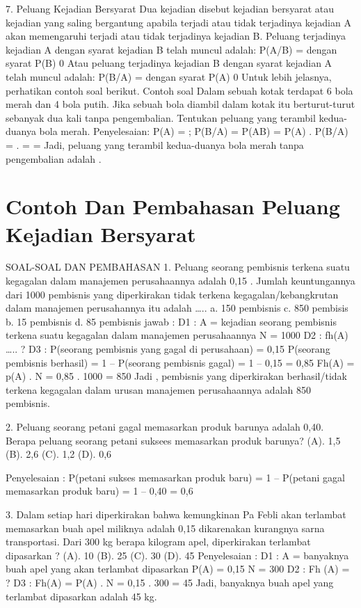 \documentclass[11pt,fleqn]{book} %
\begin{document}
{{7. Peluang Kejadian Bersyarat
Dua kejadian disebut kejadian bersyarat atau kejadian yang saling bergantung apabila
terjadi atau tidak terjadinya kejadian A akan memengaruhi terjadi atau tidak terjadinya
kejadian B. Peluang terjadinya kejadian A dengan syarat kejadian B telah muncul adalah:
P(A/B) =  dengan syarat P(B)  0
Atau peluang terjadinya kejadian B dengan syarat kejadian A telah muncul adalah:
P(B/A) =  dengan syarat P(A)  0
Untuk lebih jelasnya, perhatikan contoh soal berikut.
Contoh soal
Dalam sebuah kotak terdapat 6 bola merah dan 4 bola putih. Jika sebuah bola diambil dalam kotak itu berturut-turut sebanyak dua kali tanpa pengembalian. Tentukan peluang yang terambil kedua-duanya bola merah.
Penyelesaian:
P(A) 		=  ; P(B/A) = 
P(AB) 	= P(A) . P(B/A)
=  .   =  = 
Jadi, peluang yang terambil kedua-duanya bola merah tanpa pengembalian adalah   .

\section{Contoh Dan Pembahasan Peluang Kejadian Bersyarat}

SOAL-SOAL DAN PEMBAHASAN
1.	Peluang seorang pembisnis terkena suatu kegagalan dalam manajemen perusahaannya adalah 0,15 . Jumlah keuntungannya dari 1000 pembisnis yang diperkirakan tidak terkena kegagalan/kebangkrutan dalam manajemen perusahannya itu adalah …..
      a. 150 pembisnis          c. 850 pembisis 
      b. 15 pembisnis            d. 85 pembisnis
jawab :
D1 : A = kejadian seorang pembisnis terkena suatu kegagalan dalam manajemen perusahaannya
       N = 1000
D2 : fh(A) ….. ?
D3 :
P(seorang pembisnis yang gagal di perusahaan)       = 0,15
P(seorang pembisnis  berhasil)	 = 1 – P(seorang pembisnis gagal)
                                                                    = 1 – 0,15
                                                                    = 0,85
Fh(A) = p(A) . N
            = 0,85 . 1000
            = 850
Jadi , pembisnis yang diperkirakan berhasil/tidak terkena kegagalan dalam urusan manajemen perusahaannya adalah 850 pembisnis.

2.  Peluang seorang petani gagal memasarkan produk barunya adalah 0,40. Berapa peluang seorang petani suksees memasarkan produk barunya?
(A). 1,5		(B). 2,6		(C). 1,2		(D). 0,6




Penyelesaian :
P(petani sukses memasarkan produk baru)	=  1 – P(petani gagal memasarkan produk baru)		
=  1 – 0,40			
=  0,6

3.  Dalam setiap hari diperkirakan bahwa kemungkinan Pa Febli akan terlambat memasarkan buah apel miliknya adalah 0,15 dikarenakan kurangnya sarna transportasi.  Dari 300 kg berapa kilogram apel, diperkirakan terlambat dipasarkan ?
(A). 10			(B). 25			(C). 30			(D). 45
Penyelesaian :
D1 :  A            = banyaknya buah apel yang akan terlambat dipasarkan 
	  P(A)  = 0,15
	  N       	= 300
     D2 : Fh (A) = ?
D3 :
      Fh(A)	=  P(A) . N
		=  0,15 . 300
		=  45
Jadi, banyaknya buah apel yang terlambat dipasarkan adalah 45 kg.

}}
\end{document}
